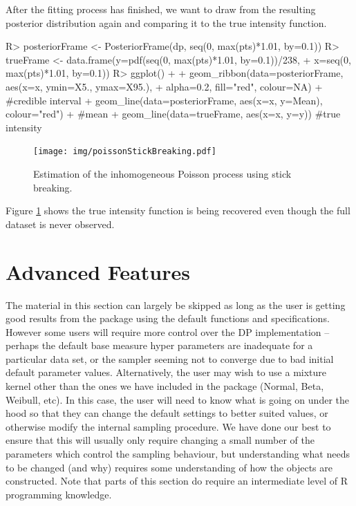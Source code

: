 \documentclass[nojss]{jss}
\begin{document}
After the fitting process has finished, we want to draw from the resulting posterior distribution again and comparing it to the true intensity function.

\begin{Schunk}
\begin{Sinput}
R> posteriorFrame <- PosteriorFrame(dp, seq(0, max(pts)*1.01, by=0.1))
R> trueFrame <- data.frame(y=pdf(seq(0, max(pts)*1.01, by=0.1))/238,
+                          x=seq(0, max(pts)*1.01, by=0.1))
R> ggplot() +
+    geom_ribbon(data=posteriorFrame, aes(x=x, ymin=X5., ymax=X95.),
+                alpha=0.2, fill="red", colour=NA) + #credible interval
+    geom_line(data=posteriorFrame, aes(x=x, y=Mean), colour="red") + #mean
+    geom_line(data=trueFrame, aes(x=x, y=y)) #true intensity
\end{Sinput}
\end{Schunk}

\begin{figure}[tb]
\centering
\texttt{[image: img/poissonStickBreaking.pdf]}
\caption{Estimation of the inhomogeneous Poisson process using stick breaking.}
\label{fig:poissonStick}
\end{figure}
Figure \ref{fig:poissonStick} shows the true intensity function is being recovered even though the full dataset is never observed.



\section{Advanced Features}
The material in this section can largely be skipped as long as the user is getting good results from the  package using the default functions and specifications. However some users will require more control over the DP implementation -- perhaps the default base measure hyper parameters are inadequate for a particular data set, or the sampler seeming not to converge due to bad initial default parameter values. Alternatively, the user may wish to use a mixture kernel other than the ones we have included in the package (Normal, Beta, Weibull, etc). In this case, the user will need to know  what is going on under the hood so that they can change the default settings to better suited values, or otherwise modify the internal sampling procedure. We have done our best to ensure that this will usually only require changing a small number of the parameters which control the sampling behaviour, but understanding what needs to be changed (and why) requires some understanding of how the objects are constructed. Note that parts of this section do require an intermediate level of R programming knowledge.
\end{document}
